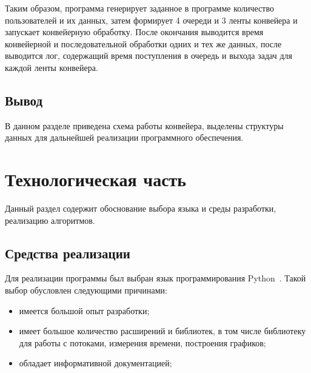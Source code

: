 \documentclass[a4paper,oneside,14pt]{extreport}
\begin{document}
Таким образом, программа генерирует заданное в программе количество пользователей и их данных, затем формирует 4 очереди и 3 ленты конвейера и запускает конвейерную обработку. После окончания выводится время конвейерной и последовательной обработки одних и тех же данных, после выводится лог, содержащий время поступления в очередь и выхода задач для каждой ленты конвейера.


\section{Вывод}
В данном разделе приведена схема работы конвейера, выделены структуры данных для дальнейшей реализации программного обеспечения. 

\chapter{Технологическая часть}
Данный раздел содержит обоснование выбора языка и среды разработки, реализацию алгоритмов.

\section{Средства реализации}
Для реализации программы был выбран язык программирования Python~\cite{python}. Такой выбор обусловлен следующими причинами:
\begin{itemize}
	\item имеется большой опыт разработки;
	\item имеет большое количество расширений и библиотек, в том числе библиотеку для работы с потоками, измерения времени, построения графиков;
	\item обладает информативной документацией;
\end{itemize}
\end{document}
